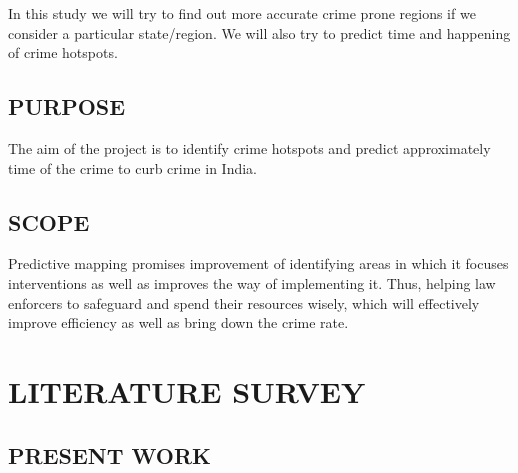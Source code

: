 \documentclass[12pt]{extreport}
\begin{document}
In this study we will try to find out more accurate crime prone regions if we consider a particular state/region. We will also try to predict time and happening of crime hotspots.



\section{PURPOSE}
\hspace*{5em}The aim of the project is to identify crime hotspots and predict approximately time of the crime to curb crime in India.


\section{SCOPE}
\hspace*{5em}Predictive mapping promises improvement of  identifying areas in which it focuses interventions as well as improves the way of  implementing it. Thus, helping law enforcers to safeguard and spend their resources wisely, which will effectively improve efficiency as well as bring down the crime rate.






\chapter{LITERATURE SURVEY}

\section{PRESENT WORK} 
\end{document}
